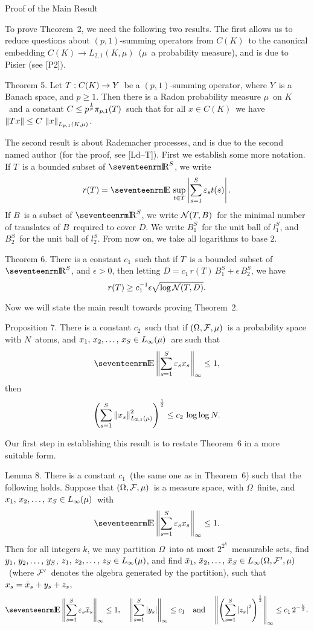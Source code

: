 \beginsection Proof of the Main Result

To prove Theorem~2, we need the following two results. The first
allows us to
reduce questions about $(p,1)$-summing operators from $C(K)$\ to the
canonical
embedding $C(K) \to L_{2,1}(K,\mu)$\ ($\mu$\ a probability measure),
and is due
to Pisier (see [P2]).

\proclaim Theorem 5.  Let $T:C(K)\to Y$\ be a $(p,1)$-summing operator,
where $Y$\ is
a Banach space, and $p \ge 1$. Then there is a Radon probability
measure
$\mu$\ on $K$\ and a constant $C \le p^{1\over p} \pi_{p,1}(T) $\ such
that for all
$x\in C(K)$\ we have $\left\| Tx \right\| \le C \, \left\| x \right\|_{L_{p,1}(K,\mu)} $.

The second result is about Rademacher processes, and is due to the
second named
author (for the proof, see [Ld--T]). First we establish some more
notation. If
$T$\ is a bounded subset of $\R^S$, we write
$$ r(T) = \E \, \sup_{t\in T} \modo{\sumS \varepsilon_s t(s)} . $$
If $B$\ is a subset of $\R^S$, we write $\cN(T,B)$\ for the minimal
number
of translates of $B$\ required to cover $D$.
We write $B_1^S$\ for the unit ball of $l^S_1$, and
$B_2^S$\ for the unit ball of $l_2^S$. From now on, we take all
logarithms to
base $2$.

\proclaim Theorem 6. There is a constant $c_1$\ such that if $T$\ is
a bounded
subset of $\R^S$, and $\epsilon>0$, then letting $D=c_1\,r(T)\,B_1^S +
\epsilon \, B_2^S$, we have
$$ r(T) \ge c_1^{-1} \epsilon \sqrt{\log\cN(T,D)} .$$

Now we will state the main result towards proving Theorem~2.

\proclaim Proposition 7. There is a constant $c_2$\ such that if
$(\Omega,\F,\mu)$\ is a probability space with $N$\ atoms, and $\xS \in
L_\infty(\mu)$\ are such that  
$$ \E \Bernwalki \le 1 ,$$ 
then
$$ \rootmean{x_s},{L_{2,1}(\mu)},2,\half \le c_2\, \log\log N .$$

Our first step in establishing this result is to restate Theorem~6 in
a more
suitable form.

\proclaim Lemma 8. There is a constant $c_1$\ (the same one as in
Theorem~6) such that the following holds. Suppose that
$(\Omega,\F,\mu)$\ is a
measure space, with $\Omega$\ finite, and $\xS\in L_\infty(\mu)$\ with
$$ \E\Bernwalki \le 1 .$$
Then for all integers $k$, we may partition $\Omega$\ into
at most $2^{2^k}$\ measurable sets, find $\yS$, $\zS \in
L_\infty(\mu)$, and find
$\bxS\in L_\infty(\Omega,\F',\mu)$\ (where $\F'$\ denotes the algebra
generated
by the partition), such that $x_s = \bar{x}_s + y_s + z_s$,
$$ \E\normo{\sumS \varepsilon_s \bx_s}_\infty \le 1
   , \quad
   \normo{\sumS\modo{y_s}}_\infty \le c_1
   \hbox{\quad and\quad}
   \normo{\left(\sumS\modo{z_s}^2\right)^\half}_\infty \le c_1 \,
2^{-\kot} .$$

